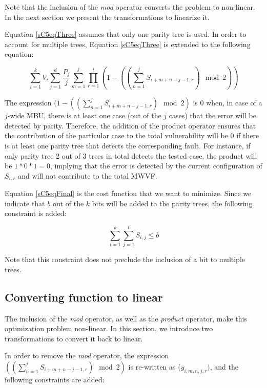 \documentclass[12pt]{yalephd}
\begin{document}
Note that the inclusion of the {\it mod} operator converts the problem to non-linear. In the next section we present the transformations to linearize it.

Equation \ref{sC5eqThree} assumes that only one parity tree is used. In order to account for multiple trees, Equation \ref{sC5eqThree} is extended to the following equation:

\begin{equation}\label{sC5eqFinal}
\sum_{i=1}^{k} V_i \sum_{j=1}^{d} \frac{P_j}{j} \sum_{m=1}^{j} \prod_{r=1}^{t} (1 - ((\sum_{n=1}^{j} S_{i+m+n-j-1,r}) \mod 2))
\end{equation}

The expression $(1 - ((\sum_{n=1}^{j} S_{i+m+n-j-1,r}) \mod 2)$ is 0 when, in case of a $j$-wide MBU, there is at least one case (out of the $j$ cases) that the error will be detected by parity. Therefore, the addition of the product operator ensures that the contribution of the particular case to the total vulnerability will be 0 if there is at least one parity tree that detects the corresponding fault. For instance, if only parity tree 2 out of 3 trees in total detects the tested case, the product will be $1*0*1=0$, implying that the error is detected by the current configuration of $S_{i,r}$ and will not contribute to the total MWVF.

Equation \ref{sC5eqFinal} is the cost function that we want to minimize. Since we indicate that $b$ out of the $k$ bits will be added to the parity trees, the following constraint is added:

\begin{equation}
\sum_{i=1}^{k} \sum_{j=1}^{t} S_{i,j} \leq b
\label{sC5eqSum}
\end{equation}

Note that this constraint does not preclude the inclusion of a bit to multiple trees.

\subsection{Converting function to linear}\label{sC5sTransfILP}

The inclusion of the {\it mod} operator, as well as the {\it product} operator, make this optimization problem non-linear. In this section, we introduce two transformations to convert it back to linear.

In order to remove the {\it mod} operator, the expression $((\sum_{n=1}^{j} S_{i+m+n-j-1,r})\mod 2)$ is re-written as ($y_{i,m,n,j,r})$, and the following constraints are added:
\end{document}
